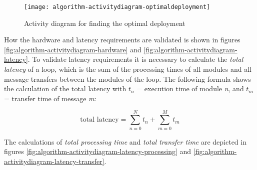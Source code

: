 \begin{figure}[htb]
    \centering
    \texttt{[image: algorithm-activitydiagram-optimaldeployment]}
    \caption{Activity diagram for finding the optimal deployment}
    \label{fig:algorithm-activitydiagram-optimaldeployment}
\end{figure}

How the hardware and latency requirements are validated is shown in figures \ref{fig:algorithm-activitydiagram-hardware} and \ref{fig:algorithm-activitydiagram-latency}.
To validate latency requirements it is necessary to calculate the \textit{total latency} of a loop, which is the sum of the processing times of all modules and all message transfers between the modules of the loop.
The following formula shows the calculation of the total latency with $t_n$ = execution time of module \textit{n}, and $t_m$ = transfer time of message \textit{m}:

\[ \textrm{total latency} = \sum_{n=0}^N t_n + \sum_{m=0}^M t_m\]

The calculations of \textit{total processing time} and \textit{total transfer time} are depicted in figures \ref{fig:algorithm-activitydiagram-latency-processing} and \ref{fig:algorithm-activitydiagram-latency-transfer}.

